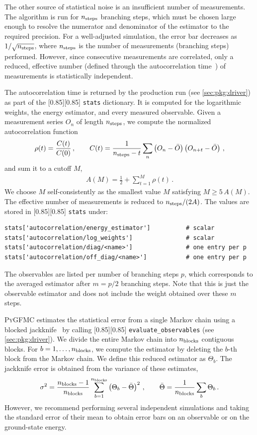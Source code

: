 \documentclass{SciPost}
\newcommand{\pyinline}[1]{\begingroup\setlength{\fboxsep}{0pt}%
  \colorbox{gray!15}{\raisebox{0pt}[0.85\ht\strutbox][0.85\dp\strutbox]{%
    \hspace{1pt}\lstinline{#1}\hspace{1pt}}}\endgroup}
\newcommand{\nsteps}{n_{\rm steps}}
\providecommand{\PyGFMC}{\textsc{PyGFMC}}
\begin{document}
The other source of statistical noise is an insufficient number of measurements.
%
The algorithm is run for $\nsteps$ branching steps, which must be chosen large enough to resolve the numerator and denominator of the estimator to the required precision.
%
For a well-adjusted simulation, the error bar decreases as $1/\sqrt{\nsteps}$, where $\nsteps$ is the number of measurements (branching steps) performed.
%
However, since consecutive measurements are correlated, only a reduced, effective number (defined through the autocorrelation time~\cite{madras_pivot_1988}) of measurements is statistically independent.

The autocorrelation time is returned by the production run (see \autoref{sec:pkg:driver}) as part of the \pyinline{stats} dictionary.
%
It is computed for the logarithmic weights, the energy estimator, and every measured observable.
%
Given a measurement series $O_n$ of length $\nsteps$, we compute the normalized autocorrelation function
\begin{align}
	\rho(t) = \frac{C(t)}{C(0)}\,,\qquad
	C(t) = \frac{1}{\nsteps-t}\sum_{n} \left(O_n-\bar{O}\right)\left(O_{n+t}-\bar{O}\right)\,,
	\label{eq:acf}
\end{align}
and sum it to a cutoff $M$,
\begin{align}
	A(M) = \frac{1}{2} + \sum_{t=1}^{M}\rho(t)\,.\label{eq:tau_int}
\end{align}
We choose $M$ self-consistently as the smallest value $M$ satisfying $M\geq 5\,A(M)$.
%
The effective number of measurements is reduced to ${\nsteps}/({2A})$.
%
The values are stored in \pyinline{stats} under:
\begin{lstlisting}
stats['autocorrelation/energy_estimator']          # scalar
stats['autocorrelation/log_weights']               # scalar
stats['autocorrelation/diag/<name>']               # one entry per p
stats['autocorrelation/off_diag/<name>']           # one entry per p
\end{lstlisting}
The observables are listed per number of branching steps $p$, which corresponds to the averaged estimator after $m=p/2$ branching steps.
%
Note that this is just the observable estimator and does not include the weight obtained over these $m$ steps.


\PyGFMC{} estimates the statistical error from a single Markov chain using a blocked jackknife~\cite{flyvbjerg_error_1989,efron_jackknife_1982} by calling \pyinline{evaluate_observables} (see \autoref{sec:pkg:driver}).
%
We divide the entire Markov chain into $n_{\rm blocks}$ contiguous blocks.
%
For $b=1,\ldots,n_{\rm blocks}$, we compute the estimator by deleting the $b$-th block from the Markov chain.
%
We define this reduced estimator as $\Theta_b$.
%
The jackknife error is obtained from the variance of these estimates,
\begin{align}
	\sigma^2 = \frac{n_{\rm blocks}-1}{n_{\rm blocks}}\sum_{b=1}^{n_{\rm blocks}} \left(\Theta_b-\bar{\Theta}\right)^2\,,
	\qquad \bar{\Theta} = \frac{1}{n_{\rm blocks}}\sum_b \Theta_b\,.
	\label{eq:jackknife}
\end{align}
However, we recommend performing several independent simulations and taking the standard error of their mean to obtain error bars on an observable or on the ground-state energy.
\end{document}
